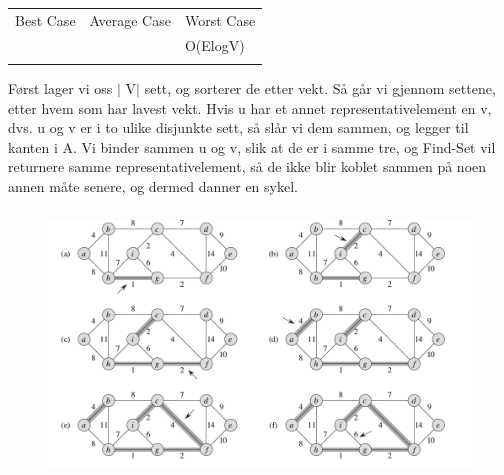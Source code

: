 \documentclass[12pt]{report}
\begin{document}
\vspace{\baselineskip}
\setlength{\parskip}{6.0pt}




\begin{table}[H]
 			\centering
\begin{tabular}{p{1.75in}p{2.41in}p{1.91in}}
\hline
\multicolumn{1}{p{1.75in}}{{\fontsize{13pt}{15.6pt}\selectfont Best Case}} & 
\multicolumn{1}{p{2.41in}}{{\fontsize{13pt}{15.6pt}\selectfont Average Case}} & 
\multicolumn{1}{p{1.91in}}{{\fontsize{13pt}{15.6pt}\selectfont Worst Case}} \\
\hhline{---}
\multicolumn{1}{p{1.75in}}{} & 
\multicolumn{1}{p{2.41in}}{} & 
\multicolumn{1}{p{1.91in}}{{\fontsize{14pt}{16.8pt}\selectfont O(ElogV)}} \\
\hhline{---}

\end{tabular}
 \end{table}




\vspace{\baselineskip}
Først lager vi oss $ \vert $ V$ \vert $  sett, og sorterer de etter vekt. Så går vi gjennom settene, etter hvem som har lavest vekt. Hvis u har et annet representativelement en v, dvs. u og v er i to ulike disjunkte sett, så slår vi dem sammen, og legger til kanten i A. Vi binder sammen u og v, slik at de er i samme tre, og Find-Set vil returnere samme representativelement, så de ikke blir koblet sammen på noen annen måte senere, og dermed danner en sykel. \par


\vspace{\baselineskip}

\vspace{\baselineskip}

\vspace{\baselineskip}



\begin{figure}[H]
	\begin{Center}
		\includegraphics[width=4.67in,height=2.77in]{./media/image121.png}
	\end{Center}
\end{figure}
\end{document}

